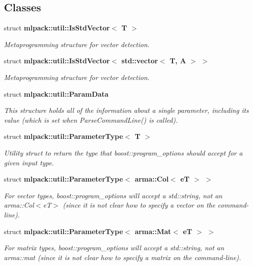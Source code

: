 \subsection*{Classes}
\begin{DoxyCompactItemize}
\item 
struct {\bf mlpack\+::util\+::\+Is\+Std\+Vector$<$ T $>$}
\begin{DoxyCompactList}\small\item\em Metaprogramming structure for vector detection. \end{DoxyCompactList}\item 
struct {\bf mlpack\+::util\+::\+Is\+Std\+Vector$<$ std\+::vector$<$ T, A $>$ $>$}
\begin{DoxyCompactList}\small\item\em Metaprogramming structure for vector detection. \end{DoxyCompactList}\item 
struct {\bf mlpack\+::util\+::\+Param\+Data}
\begin{DoxyCompactList}\small\item\em This structure holds all of the information about a single parameter, including its value (which is set when Parse\+Command\+Line() is called). \end{DoxyCompactList}\item 
struct {\bf mlpack\+::util\+::\+Parameter\+Type$<$ T $>$}
\begin{DoxyCompactList}\small\item\em Utility struct to return the type that boost\+::program\+\_\+options should accept for a given input type. \end{DoxyCompactList}\item 
struct {\bf mlpack\+::util\+::\+Parameter\+Type$<$ arma\+::\+Col$<$ e\+T $>$ $>$}
\begin{DoxyCompactList}\small\item\em For vector types, boost\+::program\+\_\+options will accept a std\+::string, not an arma\+::\+Col$<$e\+T$>$ (since it is not clear how to specify a vector on the command-\/line). \end{DoxyCompactList}\item 
struct {\bf mlpack\+::util\+::\+Parameter\+Type$<$ arma\+::\+Mat$<$ e\+T $>$ $>$}
\begin{DoxyCompactList}\small\item\em For matrix types, boost\+::program\+\_\+options will accept a std\+::string, not an arma\+::mat (since it is not clear how to specify a matrix on the command-\/line). \end{DoxyCompactList}\item 

\end{DoxyCompactItemize}
